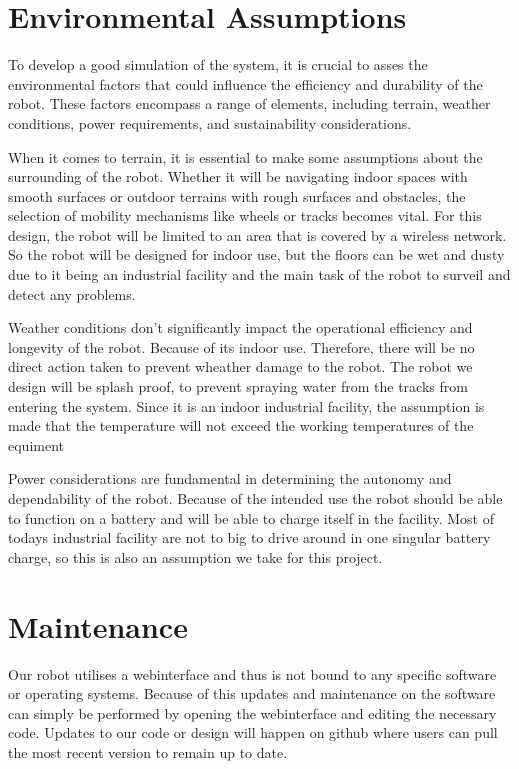 \documentclass[a4paper]{article}
\begin{document}
\section*{Environmental Assumptions}
To develop a good simulation of the system, it is crucial to asses the environmental factors that could influence the efficiency and durability of the robot. These factors encompass a range of elements, including terrain, weather conditions, power requirements, and sustainability considerations.

When it comes to terrain, it is essential to make some assumptions about the surrounding of the robot. Whether it will be navigating indoor spaces with smooth surfaces or outdoor terrains with rough surfaces and obstacles, the selection of mobility mechanisms like wheels or tracks becomes vital. For this design, the robot will be limited to an area that is covered by a wireless network. So the robot will be designed for indoor use, but the floors can be wet and dusty due to it being an industrial facility and the main task of the robot to surveil and detect any problems.

Weather conditions don't significantly impact the operational efficiency and longevity of the robot. Because of its indoor use. Therefore, there will be no direct action taken to prevent wheather damage to the robot. The robot we design will be splash proof, to prevent spraying water from the tracks from entering the system. Since it is an indoor industrial facility, the assumption is made that the temperature will not exceed the working temperatures of the equiment

Power considerations are fundamental in determining the autonomy and dependability of the robot. Because of the intended use the robot should be able to function on a battery and will be able to charge itself in the facility. Most of todays industrial facility are not to big to drive around in one singular battery charge, so this is also an assumption we take for this project.

\section*{Maintenance}
Our robot utilises a webinterface and thus is not bound to any specific software or operating systems. Because of this updates and maintenance on the software can simply be performed by opening the webinterface and editing the necessary code.
Updates to our code or design will happen on github where users can pull the most recent version to remain up to date.




\end{document}
